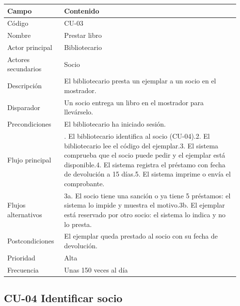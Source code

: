 \documentclass[11pt,a4paper]{article}
\begin{document}
{\small
\begin{longtable}{@{}>{\raggedright\arraybackslash}p{0.232\linewidth}>{\raggedright\arraybackslash}p{0.717\linewidth}@{}}
\toprule
\textbf{Campo} & \textbf{Contenido} \\
\midrule
\endhead
Código & CU-03 \\
Nombre & Prestar libro \\
Actor principal & Bibliotecario \\
Actores secundarios & Socio \\
Descripción & El bibliotecario presta un ejemplar a un socio en el mostrador. \\
Disparador & Un socio entrega un libro en el mostrador para llevárselo. \\
Precondiciones & El bibliotecario ha iniciado sesión. \\
Flujo principal & 1. El bibliotecario identifica al socio (CU-04).\newline{}2. El bibliotecario lee el código del ejemplar.\newline{}3. El sistema comprueba que el socio puede pedir y el ejemplar está disponible.\newline{}4. El sistema registra el préstamo con fecha de devolución a 15 días.\newline{}5. El sistema imprime o envía el comprobante. \\
Flujos alternativos & 3a. El socio tiene una sanción o ya tiene 5 préstamos: el sistema lo impide y muestra el motivo.\newline{}3b. El ejemplar está reservado por otro socio: el sistema lo indica y no lo presta. \\
Postcondiciones & El ejemplar queda prestado al socio con su fecha de devolución. \\
Prioridad & Alta \\
Frecuencia & Unas 150 veces al día \\
\bottomrule
\end{longtable}}

\subsection*{CU-04 Identificar socio}
\end{document}
